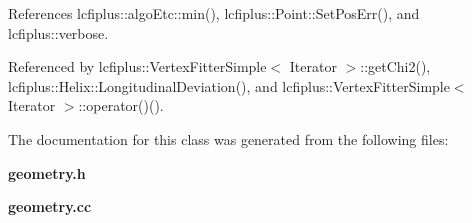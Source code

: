 References lcfiplus\+::algo\+Etc\+::min(), lcfiplus\+::\+Point\+::\+Set\+Pos\+Err(), and lcfiplus\+::verbose.



Referenced by lcfiplus\+::\+Vertex\+Fitter\+Simple$<$ Iterator $>$\+::get\+Chi2(), lcfiplus\+::\+Helix\+::\+Longitudinal\+Deviation(), and lcfiplus\+::\+Vertex\+Fitter\+Simple$<$ Iterator $>$\+::operator()().



The documentation for this class was generated from the following files\+:\begin{DoxyCompactItemize}
\item 
\textbf{ geometry.\+h}\item 
\textbf{ geometry.\+cc}\end{DoxyCompactItemize}

